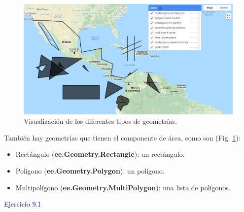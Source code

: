 \documentclass[
  12pt,
  letterpaper,
  twoside]{book}
\providecommand{\tightlist}{%
  \setlength{\itemsep}{0pt}\setlength{\parskip}{0pt}}
\newcommand\boldpurple[1]{\textcolor{darkpurple}{\textbf{#1}}}
\begin{document}
\begin{figure}[H]

{\centering \includegraphics[width=0.95\linewidth]{Img/ej9} 

}

\caption{Visualización de los diferentes tipos de geometrías.}\label{fig:f61}
\end{figure}

También hay geometrías que tienen el componente de área, como son (\textcolor{darkblue}{Fig.} \ref{fig:f61}):

\begin{itemize}
\tightlist
\item
  Rectángulo (\boldpurple{ee.Geometry.Rectangle}): un rectángulo.
\item
  Polígono (\boldpurple{ee.Geometry.Polygon}): un polígono.
\item
  Multipolígono (\boldpurple{ee.Geometry.MultiPolygon}): una lista de polígonos.
\end{itemize}

\textcolor{darkblue}{Ejercicio 9.1}
\end{document}
